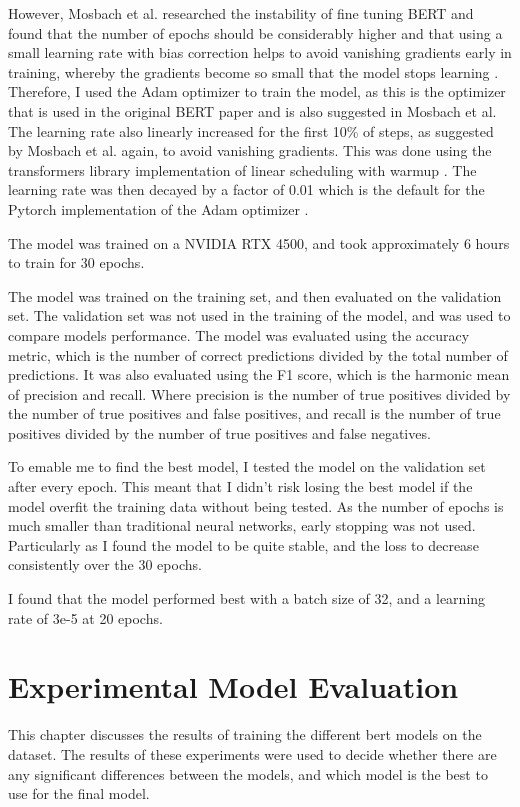 \documentclass{UoYCSproject}
\begin{document}
    However, Mosbach et al. researched the instability of fine tuning BERT and found that the number of epochs should be considerably higher and that using a small learning rate with bias correction helps to avoid vanishing gradients early in training, whereby the gradients become so small that the model stops learning \cite{mosbach2021stability}.
    Therefore, I used the Adam optimizer to train the model, as this is the optimizer that is used in the original BERT paper and is also suggested in Mosbach et al.
    The learning rate also linearly increased for the first 10\% of steps, as suggested by Mosbach et al. again, to avoid vanishing gradients.
    This was done using the transformers library implementation of linear scheduling with warmup \cite{transformerLinearSchedular}.
    The learning rate was then decayed by a factor of 0.01 which is the default for the Pytorch implementation of the Adam optimizer \cite{adamPytorch}.

    The model was trained on a NVIDIA RTX 4500, and took approximately 6 hours to train for 30 epochs. \par

    The model was trained on the training set, and then evaluated on the validation set.
    The validation set was not used in the training of the model, and was used to compare models performance.
    The model was evaluated using the accuracy metric, which is the number of correct predictions divided by the total number of predictions.
    It was also evaluated using the F1 score, which is the harmonic mean of precision and recall.
    Where precision is the number of true positives divided by the number of true positives and false positives, and recall is the number of true positives divided by the number of true positives and false negatives.

    To emable me to find the best model, I tested the model on the validation set after every epoch.
    This meant that I didn't risk losing the best model if the model overfit the training data without being tested.
    As the number of epochs is much smaller than traditional neural networks, early stopping was not used.
    Particularly as I found the model to be quite stable, and the loss to decrease consistently over the 30 epochs.

    I found that the model performed best with a batch size of 32, and a learning rate of 3e-5 at 20 epochs.

    \chapter{Experimental Model Evaluation}
    \label{ch:experimental-model-evaluation}
    This chapter discusses the results of training the different bert models on the dataset.
    The results of these experiments were used to decide whether there are any significant differences between the models, and which model is the best to use for the final model.
\end{document}
